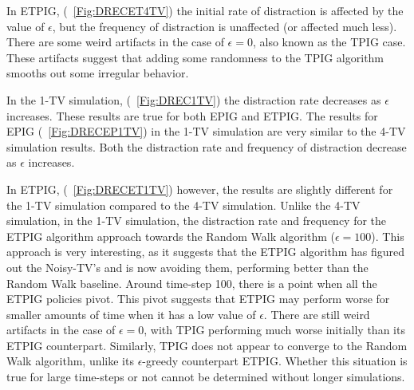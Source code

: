 \documentclass[12pt]{thesis}
\begin{document}
In ETPIG, (\figurename~\ref{Fig:DRECET4TV}) the initial rate of distraction is affected by the value of $\epsilon$, but the frequency of distraction is unaffected (or affected much less). There are some weird artifacts in the case of $\epsilon = 0$, also known as the TPIG case. These artifacts suggest that adding some randomness to the TPIG algorithm smooths out some irregular behavior.

In the 1-TV simulation, (\figurename~\ref{Fig:DREC1TV}) the distraction rate decreases as $\epsilon$ increases. These results are true for both EPIG and ETPIG. The results for EPIG (\figurename~\ref{Fig:DRECEP1TV}) in the 1-TV simulation are very similar to the 4-TV simulation results. Both the distraction rate and frequency of distraction decrease as $\epsilon$ increases.

In ETPIG, (\figurename~\ref{Fig:DRECET1TV}) however, the results are slightly different for the 1-TV simulation compared to the 4-TV simulation. Unlike the 4-TV simulation, in the 1-TV simulation, the distraction rate and frequency for the ETPIG algorithm approach towards the Random Walk algorithm ($\epsilon = 100$). This approach is very interesting, as it suggests that the ETPIG algorithm has figured out the Noisy-TV's and is now avoiding them, performing better than the Random Walk baseline. Around time-step 100, there is a point when all the ETPIG policies pivot. This pivot suggests that ETPIG may perform worse for smaller amounts of time when it has a low value of $\epsilon$. There are still weird artifacts in the case of $\epsilon = 0$, with TPIG performing much worse initially than its ETPIG counterpart. Similarly, TPIG does not appear to converge to the Random Walk algorithm, unlike its $\epsilon$-greedy counterpart ETPIG. Whether this situation is true for large time-steps or not cannot be determined without longer simulations. 
\end{document}
